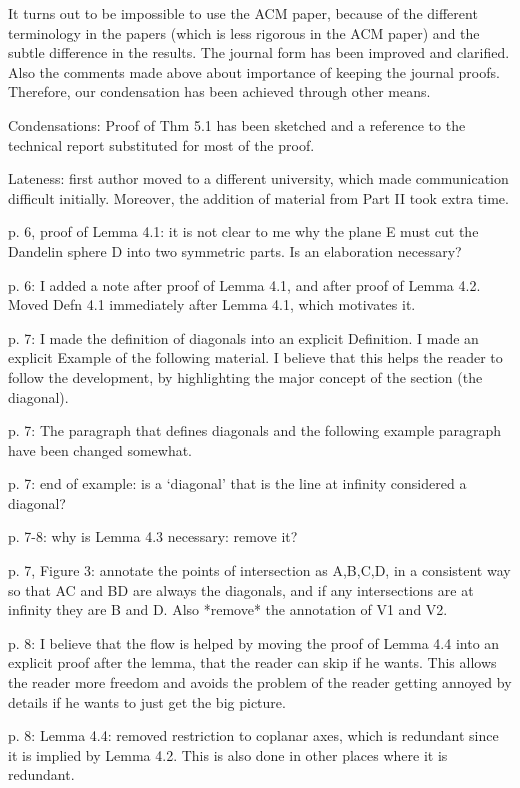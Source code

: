 	It turns out to be impossible to use the ACM paper,
	because of the different terminology in the papers
	(which is less rigorous in the ACM paper)
	and the subtle difference in the results.
	The journal form has been improved and clarified.
	Also the comments made above about importance of keeping 
	the journal proofs.
	Therefore, our condensation has been achieved through other
	means.

	Condensations: Proof of Thm 5.1 has been sketched and a reference
	to the technical report substituted for most of the proof.

	Lateness: first author moved to a different university,
	which made communication difficult initially.
	Moreover, the addition of material from Part II took extra time.
	
p. 6, proof of Lemma 4.1: it is not clear to me why the plane E must cut
	the Dandelin sphere D into two symmetric parts.
	Is an elaboration necessary?

p. 6: I added a note after proof of Lemma 4.1, and after proof of Lemma 4.2.
	Moved Defn 4.1 immediately after Lemma 4.1, which motivates it.
	
p. 7: I made the definition of diagonals into an explicit Definition.
	I made an explicit Example of the following material.
	I believe that this helps the reader to follow the
	development, by highlighting the major concept of the section
	(the diagonal).

p. 7: The paragraph that defines diagonals and 
	the following example paragraph have been changed somewhat.
	
p. 7: end of example: is a `diagonal' that is the line at infinity
	considered a diagonal?

p. 7-8: why is Lemma 4.3 necessary: remove it?

p. 7, Figure 3: annotate the points of intersection as A,B,C,D, 
	in a consistent way so that AC and BD are always the diagonals,
	and if any intersections are at infinity they are B and D.
	Also *remove* the annotation of V1 and V2.

p. 8: I believe that the flow is helped by moving the proof of Lemma 4.4
	into an explicit proof after the lemma, that the reader can skip
	if he wants.
	This allows the reader more freedom and avoids the problem
	of the reader getting annoyed by details if he wants to just
	get the big picture.

p. 8: Lemma 4.4: removed restriction to coplanar axes, which is redundant
	since it is implied by Lemma 4.2.
	This is also done in other places where it is redundant.

